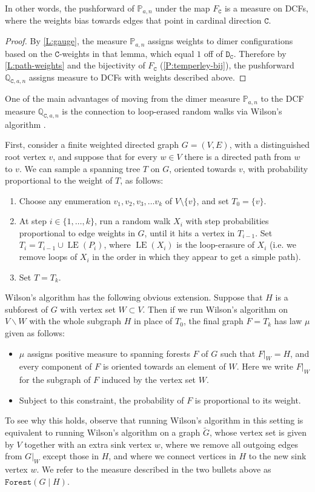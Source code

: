 \documentclass[11pt,twoside]{amsart}
\theoremstyle{plain}
\numberwithin{quest}{section}
\theoremstyle{remark}
\numberwithin{rem}{section}
\theoremstyle{definition}
\newcommand{\Q}{\mathbb{Q}}
\renewcommand{\P}{\mathbb{P}}
\renewcommand{\tt}[1]{{\mathtt{#1}}}
\begin{document}
	
	
	
	In other words, the pushforward of $\mathbb P_{a, n}$ under the map $F_\tt{C}$ is a measure on DCFs, where the weights bias towards edges that point in cardinal direction $\tt{C}$. 
	
	
	\begin{proof}
		By \cref{L:gauge}, the measure $\mathbb P_{a, n}$ assigns weights to dimer configurations based on the $\tt{C}$-weights in that lemma, which equal $1$ off of $\tt{D_C}$. Therefore by \cref{L:path-weights} and the bijectivity of $F_\tt{C}$ (\cref{P:temperley-bij}), the pushforward $\Q_{\tt{C}, a, n}$ assigns measure to DCFs with weights described above.
	\end{proof}
	
	One of the main advantages of moving from the dimer measure $\P_{a, n}$ to the DCF measure $\Q_{\tt{C}, a, n}$ is the connection to loop-erased random walks via Wilson's algorithm \cite{Wil96}. 
	
	First, consider a finite weighted directed graph $G = (V, E)$, with a distinguished root vertex $v$, and suppose that for every $w \in V$ there is a directed path from $w$ to $v$. We can sample a spanning tree $T$ on $G$, oriented towards $v$, with probability proportional to the weight of $T$, as follows:
	\begin{enumerate}[label=\arabic*.]
		\item Choose any enumeration $v_1, v_2, v_3, \dots v_k$ of $V \setminus \{v\}$, and set $T_0 = \{v\}$.
		\item At step $i \in \{1, \dots, k\}$, run a random walk $X_i$ with step probabilities proportional to edge weights in $G$, until it hits a vertex in $T_{i-1}$. Set $T_i = T_{i-1} \cup \operatorname{LE}(P_i)$, where $\operatorname{LE}(X_i)$ is the loop-erasure of $X_i$ (i.e. we remove loops of $X_i$ in the order in which they appear to get a simple path). 
		\item Set $T = T_k$. 
	\end{enumerate}
	Wilson's algorithm has the following obvious extension. Suppose that $H$ is a subforest of $G$ with vertex set $W \subset V$. Then if we run Wilson's algorithm on $V \backslash W$ with the whole subgraph $H$ in place of $T_0$, the final graph $F = T_k$ has law $\mu$ given as follows:
	\begin{itemize}[nosep]
		\item $\mu$ assigns positive measure to spanning forests $F$ of $G$ such that $F|_W = H$, and every component of $F$ is oriented towards an element of $W$. Here we write $F|_W$ for the subgraph of $F$ induced by the vertex set $W$.
		\item Subject to this constraint, the probability of $F$ is proportional to its weight.
	\end{itemize}
	To see why this holds, observe that running Wilson's algorithm in this setting is equivalent to running Wilson's algorithm on a graph $\tilde G$, whose vertex set is given by $V$ together with an extra sink vertex $w$, where we remove all outgoing edges from $G|_W$ except those in $H$, and where we connect vertices in $H$ to the new sink vertex $w$. We refer to the measure described in the two bullets above as $\tt{Forest}(G \mid H)$.
	
\end{document}
